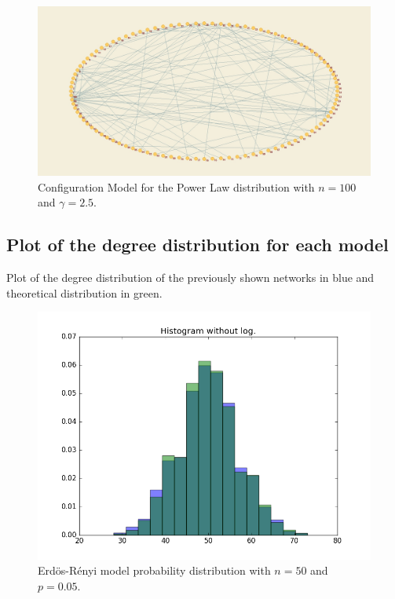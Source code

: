 \documentclass[12pt,a4paper,oneside]{article}
\numberwithin{equation}{section}
\numberwithin{equation}{section}
\theoremstyle{definition}
\begin{document}
\begin{figure}[h!]
	\centering
	\includegraphics[scale=0.25]{plots/CMpl100g25.jpg}
	\caption{Configuration Model for the Power Law distribution with $n=100$ and $\gamma=2.5$.}
\end{figure}



\subsection{Plot of the degree distribution for each model}

Plot of the degree distribution of the previously shown networks in blue and theoretical distribution in green.

\begin{figure}[h!]
	\centering
	\includegraphics[scale=1]{plots/ERempvstheor.png}
	\caption{Erdös-Rényi model probability distribution with $n=50$ and $p=0.05$.}
\end{figure}
\end{document}
